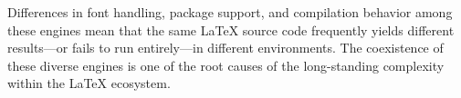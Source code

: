 Differences in font handling, package support, and compilation behavior among these engines mean that the same \LaTeX{} source code frequently yields different results---or fails to run entirely---in different environments. The coexistence of these diverse engines is one of the root causes of the long-standing complexity within the \LaTeX{} ecosystem.

